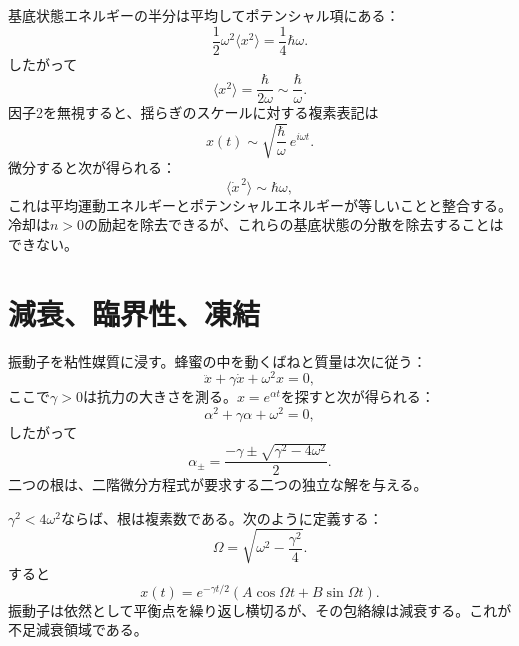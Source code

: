 基底状態エネルギーの半分は平均してポテンシャル項にある：
\[
\frac12\omega^2\langle x^2\rangle
=\frac14\hbar\omega.
\]
したがって
\begin{equation}
\langle x^2\rangle=\frac{\hbar}{2\omega}
\sim\frac{\hbar}{\omega}.
\label{eq:c10-zero-point-position}
\end{equation}
因子2を無視すると、揺らぎのスケールに対する複素表記は
\[
x(t)\sim\sqrt{\frac{\hbar}{\omega}}\,e^{i\omega t}.
\]
微分すると次が得られる：
\begin{equation}
\langle\dot x^{\,2}\rangle\sim\hbar\omega,
\label{eq:c10-zero-point-velocity}
\end{equation}
これは平均運動エネルギーとポテンシャルエネルギーが等しいことと整合する。冷却は\(n>0\)の励起を除去できるが、これらの基底状態の分散を除去することはできない。

\section{減衰、臨界性、凍結}

振動子を粘性媒質に浸す。蜂蜜の中を動くばねと質量は次に従う：
\begin{equation}
\ddot x+\gamma\dot x+\omega^2x=0,
\label{eq:c10-damped}
\end{equation}
ここで\(\gamma>0\)は抗力の大きさを測る。\(x=e^{\alpha t}\)を探すと次が得られる：
\begin{equation}
\alpha^2+\gamma\alpha+\omega^2=0,
\end{equation}
したがって
\begin{equation}
\alpha_\pm
=\frac{-\gamma\pm\sqrt{\gamma^2-4\omega^2}}{2}.
\label{eq:c10-damped-roots}
\end{equation}
二つの根は、二階微分方程式が要求する二つの独立な解を与える。

\begin{classroomqa}
\end{classroomqa}

\(\gamma^2<4\omega^2\)ならば、根は複素数である。次のように定義する：
\[
\Omega=\sqrt{\omega^2-\frac{\gamma^2}{4}}.
\]
すると
\begin{equation}
x(t)=e^{-\gamma t/2}
\left(A\cos\Omega t+B\sin\Omega t\right).
\label{eq:c10-underdamped}
\end{equation}
振動子は依然として平衡点を繰り返し横切るが、その包絡線は減衰する。これが不足減衰領域である。

